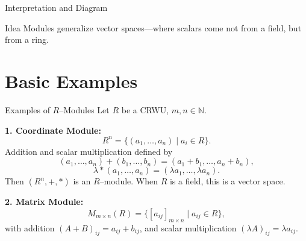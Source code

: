 \documentclass[11pt,aspectratio=43,ignorenonframetext,t]{beamer}
\begin{document}
\begin{frame}[fragile]{Interpretation and Diagram}
\begin{block}{Idea}
Modules generalize vector spaces---where scalars come not from a field, but from a ring.

\begin{center}
\centering
{}
\end{center}

\end{block}
\end{frame}
\section{Basic Examples}

\begin{frame}{Examples of $R$–Modules}
Let $R$ be a CRWU, $m,n\in\mathbb{N}$.

\textbf{1. Coordinate Module:}  
\[
R^n = \{(a_1,\dots,a_n)\mid a_i\in R\}.
\]
Addition and scalar multiplication defined by
\[
(a_1,\dots,a_n)+(b_1,\dots,b_n)=(a_1+b_1,\dots,a_n+b_n),
\]
\[
\lambda*(a_1,\dots,a_n)=(\lambda a_1,\dots,\lambda a_n).
\]
Then $(R^n,+,*)$ is an $R$–module.  
When $R$ is a field, this is a vector space.

\textbf{2. Matrix Module:}  
\[
M_{m\times n}(R)=\{[a_{ij}]_{m\times n}\mid a_{ij}\in R\},
\]
with addition $(A+B)_{ij}=a_{ij}+b_{ij}$,  
and scalar multiplication $(\lambda A)_{ij}=\lambda a_{ij}$.
\end{frame}
\end{document}
